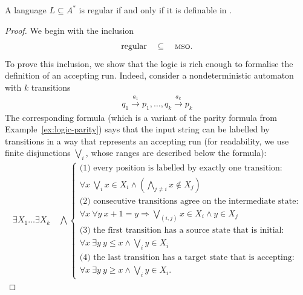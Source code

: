 \begin{theorem}
    \label{thm:mso-logic-languages}
    A language $L \subseteq A^*$ is regular if and only if it is definable in \mso.
\end{theorem}
\begin{proof}
    We begin with the inclusion 
    \begin{align*}
    \text{regular} \quad \subseteq \quad \text{{\textsc{mso}}.}
    \end{align*}
    To prove this inclusion, we show that the logic \mso is rich enough to formalise  the definition of an accepting run. Indeed, consider a nondeterministic automaton with $k$ transitions
    \begin{align*}
    q_1 \xrightarrow {a_1} p_1 ,\ldots, q_k \xrightarrow {a_k} p_k
    \end{align*}
    The corresponding \mso formula (which is a variant of the parity formula from Example~\ref{ex:logic-parity}) says that the input string can be labelled by transitions in a way that represents an accepting run (for readability, we use finite disjunctions $\bigvee_i$, whose ranges are described below the formula): 
    \begin{align*}
        \exists X_1 \ldots \exists X_k 
        \quad \bigwedge
        \begin{cases}
            \text{(1) every position is labelled by exactly one transition:}\\
            \forall x \ \bigvee_i x \in X_i  \land (\bigwedge_{j \neq i} x \not \in X_j)\\
            \text{(2) consecutive transitions agree on the intermediate state:}\\
            \forall x \ \forall y\  x+1 = y \Rightarrow \bigvee_{(i,j) } x \in X_i \land y \in X_j \\ 
            \text{(3) the first transition has a source state that is initial:}\\
            \forall x \ \exists y \ y \leq x \land \bigvee_{i} y \in X_i\\
            \text{(4) the last transition has a target state that is accepting:}\\
            \forall x \ \exists y \ y \geq x \land \bigvee_{i} y \in X_i.
        \end{cases}
    \end{align*}

\end{proof}
